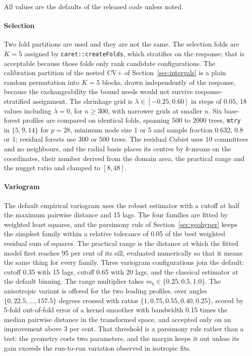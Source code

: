\documentclass[preprint,12pt,authoryear]{elsarticle}
\begin{document}
All values are the defaults of the released code unless noted.

\paragraph{Selection} Two fold partitions are used and they are not the same.
The selection folds are $K=5$ assigned by \texttt{caret::createFolds}, which
stratifies on the response; that is acceptable because those folds only rank
candidate configurations. The calibration partition of the nested CV+ of
Section~\ref{sec:intervals} is a plain random permutation into $K=5$ blocks,
drawn independently of the response, because the exchangeability the bound needs
would not survive response-stratified assignment. The shrinkage grid is
$\lambda \in [-0.25, 0.60]$ in steps of $0.05$, 18 values including $\lambda=0$,
for $n \ge 300$, with narrower grids at smaller $n$. Six base-forest profiles are
compared on identical folds, spanning 500 to 2000 trees, \texttt{mtry} in
$\{5,9,14\}$ for $p=28$, minimum node size 1 or 5 and sample fraction 0.632, 0.8
or 1; residual forests use 300 or 500 trees. The residual Cubist uses 10
committees and no neighbours, and the radial basis places its centres by
$k$-means on the coordinates, their number derived from the domain area, the
practical range and the nugget ratio and clamped to $[8,48]$.

\paragraph{Variogram} The default empirical variogram uses the robust estimator
with a cutoff at half the maximum pairwise distance and 15 lags. The four
families are fitted by weighted least squares, and the parsimony rule of
Section~\ref{sec:geohyper} keeps the simplest family within a relative
tolerance of 0.05 of the best weighted residual sum of squares. The practical
range is the distance at which the fitted model first reaches 95 per cent of its
sill, evaluated numerically so that it means the same thing for every family.
Three variogram configurations join the default: cutoff 0.35 with 15 lags,
cutoff 0.65 with 20 lags, and the classical estimator at the default binning.
The range multiplier takes $m_b \in \{0.25,0.5,1.0\}$. The anisotropic variant
is offered for the two leading profiles, over angles $\{0,22.5,\dots,157.5\}$
degrees crossed with ratios $\{1,0.75,0.55,0.40,0.25\}$, scored by 5-fold
out-of-fold error of a kernel smoother with bandwidth 0.15 times the median
pairwise distance in the transformed space, and accepted only on an improvement
above 3 per cent. That threshold is a parsimony rule rather than a test: the
geometry costs two parameters, and the margin keeps it out unless its gain
exceeds the run-to-run variation observed in isotropic fits.
\end{document}
